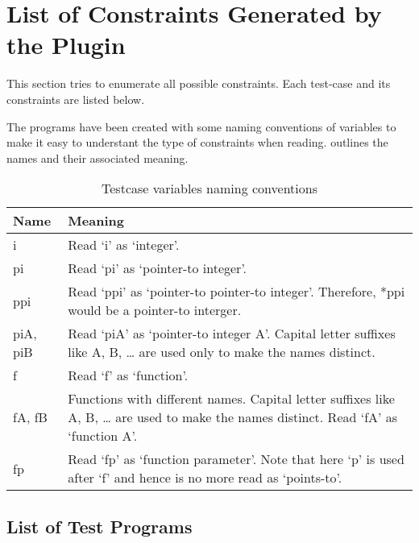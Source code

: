 \section{List of Constraints Generated by the Plugin}\label{sec:constraints}
This section tries to enumerate all possible constraints. Each test-case and its constraints are listed below.

The programs have been created with some naming conventions of variables to make it easy to understant the type of constraints when reading.  outlines the names and their associated meaning.

\begin{table}
\begin{center}
    \begin{tabular}{| m{10ex} | m{70ex} |}
    \hline
    \textbf{Name} & \textbf{Meaning} \\
    \hline
    \hline
    i & Read `i' as `integer'. \\
    \hline
    pi & Read `pi' as `pointer-to integer'.\\
    \hline
    ppi & Read `ppi' as `pointer-to pointer-to integer'. Therefore, *ppi would be a pointer-to interger. \\
    \hline
    piA, piB & Read `piA' as  `pointer-to integer A'. Capital letter suffixes like A, B, \ldots{} are used only to make the names distinct. \\
    \hline
    f & Read `f' as `function'.\\
    \hline
    fA, fB & Functions with different names. Capital letter suffixes like A, B, \ldots{} are used to make the names distinct. Read `fA' as `function A'.\\
    \hline
    fp & Read `fp' as `function parameter'. Note that here `p' is used after `f' and hence is no more read as `points-to'.\\
    \hline
    \end{tabular}
    \caption{Testcase variables naming conventions}
    \label{table:varname}
\end{center}
\end{table}

\subsection{List of Test Programs}

